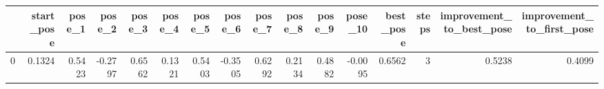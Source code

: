 \begin{tabular}{lrrrrrrrrrrrrrrr}
\toprule
{} &  start\_pose &  pose\_1 &  pose\_2 &  pose\_3 &  pose\_4 &  pose\_5 &  pose\_6 &  pose\_7 &  pose\_8 &  pose\_9 &  pose\_10 &  best\_pose &  steps &  improvement\_to\_best\_pose &  improvement\_to\_first\_pose \\
\midrule
0 &      0.1324 &  0.5423 & -0.2797 &  0.6562 &  0.1321 &  0.5403 & -0.3505 &  0.6292 &  0.2134 &  0.4882 &  -0.0095 &     0.6562 &      3 &                    0.5238 &                     0.4099 \\
\bottomrule
\end{tabular}
